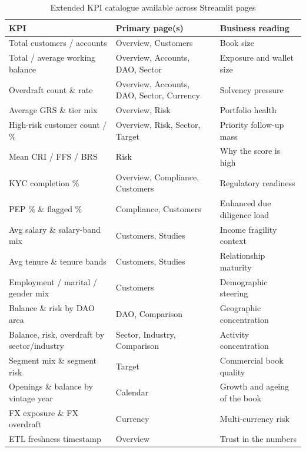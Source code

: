 \begin{table}[H]
\centering
\caption{Extended KPI catalogue available across Streamlit pages}
\label{tab:extended_kpi_catalog}
\renewcommand{\arraystretch}{1.15}
\scriptsize
\begin{tabular}{|p{4.2cm}|p{4.0cm}|p{5.8cm}|}
\hline
\rowcolor{blue!15}
\textbf{KPI} & \textbf{Primary page(s)} & \textbf{Business reading} \\
\hline
Total customers / accounts & Overview, Customers & Book size \\
\hline
Total / average working balance & Overview, Accounts, DAO, Sector & Exposure and wallet size \\
\hline
Overdraft count \& rate & Overview, Accounts, DAO, Sector, Currency & Solvency pressure \\
\hline
Average GRS \& tier mix & Overview, Risk & Portfolio health \\
\hline
High-risk customer count / \% & Overview, Risk, Sector, Target & Priority follow-up mass \\
\hline
Mean CRI / FFS / BRS & Risk & Why the score is high \\
\hline
KYC completion \% & Overview, Compliance, Customers & Regulatory readiness \\
\hline
PEP \% \& flagged \% & Compliance, Customers & Enhanced due diligence load \\
\hline
Avg salary \& salary-band mix & Customers, Studies & Income fragility context \\
\hline
Avg tenure \& tenure bands & Customers, Studies & Relationship maturity \\
\hline
Employment / marital / gender mix & Customers & Demographic steering \\
\hline
Balance \& risk by DAO area & DAO, Comparison & Geographic concentration \\
\hline
Balance, risk, overdraft by sector/industry & Sector, Industry, Comparison & Activity concentration \\
\hline
Segment mix \& segment risk & Target & Commercial book quality \\
\hline
Openings \& balance by vintage year & Calendar & Growth and ageing of the book \\
\hline
FX exposure \& FX overdraft & Currency & Multi-currency risk \\
\hline
ETL freshness timestamp & Overview & Trust in the numbers \\
\hline
\end{tabular}
\end{table}

